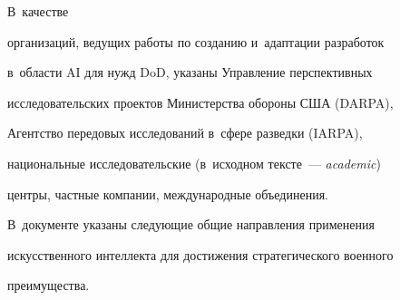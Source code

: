 В~качестве


организаций, ведущих работы по созданию и~адап\-та\-ции разработок


в~области AI для нужд DoD, указаны Управ\-ле\-ние перспективных


исследовательских проектов Министерства обороны США (DARPA),


Агентство передовых исследований в~сфере разведки (IARPA),


национальные исследовательские (в~исходном тексте~--- \textit{academic})


центры, частные компании, международные объединения.





  В~документе указаны следующие общие направления применения


искусственного интеллекта для достижения стратегического военного


преимущества.


